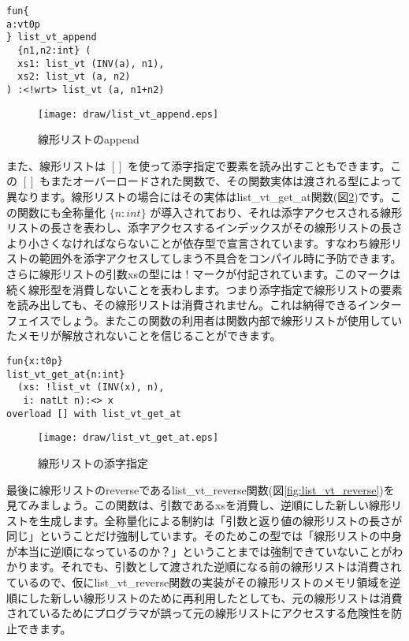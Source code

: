 \documentclass{ipsjprosym}
\begin{document}
\vspace{3mm}
\begin{verbatim}
fun{
a:vt0p
} list_vt_append
  {n1,n2:int} (
  xs1: list_vt (INV(a), n1),
  xs2: list_vt (a, n2)
) :<!wrt> list_vt (a, n1+n2)
\end{verbatim}
\vspace{3mm}

\begin{figure}[h]
\centering
\texttt{[image: draw/list\_vt\_append.eps]}
\caption{線形リストのappend}
\label{fig:list_vt_append}
\end{figure}

また、線形リストは $[]$ を使って添字指定で要素を読み出すこともできます。この $[]$ もまたオーバーロードされた関数で、その関数実体は渡される型によって異なります。線形リストの場合にはその実体はlist\_vt\_get\_at関数(図\ref{fig:list_vt_get_at})です。この関数にも全称量化 $\{n:int\}$ が導入されており、それは添字アクセスされる線形リストの長さを表わし、添字アクセスするインデックスがその線形リストの長さより小さくなければならないことが依存型で宣言されています。すなわち線形リストの範囲外を添字アクセスしてしまう不具合をコンパイル時に予防できます。さらに線形リストの引数xsの型には $!$ マークが付記されています。このマークは続く線形型を消費しないことを表わします。つまり添字指定で線形リストの要素を読み出しても、その線形リストは消費されません。これは納得できるインターフェイスでしょう。またこの関数の利用者は関数内部で線形リストが使用していたメモリが解放されないことを信じることができます。

\vspace{3mm}
\begin{verbatim}
fun{x:t0p}
list_vt_get_at{n:int}
  (xs: !list_vt (INV(x), n),
   i: natLt n):<> x
overload [] with list_vt_get_at
\end{verbatim}
\vspace{3mm}

\begin{figure}[h]
\centering
\texttt{[image: draw/list\_vt\_get\_at.eps]}
\caption{線形リストの添字指定}
\label{fig:list_vt_get_at}
\end{figure}

最後に線形リストのreverseであるlist\_vt\_reverse関数(図\ref{fig:list_vt_reverse})を見てみましょう。この関数は、引数であるxsを消費し、逆順にした新しい線形リストを生成します。全称量化による制約は「引数と返り値の線形リストの長さが同じ」ということだけ強制しています。そのためこの型では「線形リストの中身が本当に逆順になっているのか？」ということまでは強制できていないことがわかります。それでも、引数として渡された逆順になる前の線形リストは消費されているので、仮にlist\_vt\_reverse関数の実装がその線形リストのメモリ領域を逆順にした新しい線形リストのために再利用したとしても、元の線形リストは消費されているためにプログラマが誤って元の線形リストにアクセスする危険性を防止できます。
\end{document}

